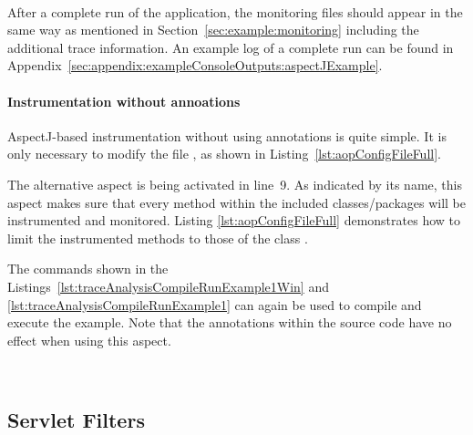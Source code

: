 \


\setBashListing



\noindent After a complete run of the application, the monitoring files should appear in %
the same way as mentioned in Section~\ref{sec:example:monitoring} including the %
additional trace information. An example log of a complete run can be found in %
Appendix~\ref{sec:appendix:exampleConsoleOutputs:aspectJExample}.

\paragraph*{Instrumentation without annoations}%

AspectJ-based instrumentation without using annotations is quite simple. It is %
only necessary to modify the file \file{\aopConfigFile{}}, as shown %
in Listing~\ref{lst:aopConfigFileFull}.

\setXMLListing


\noindent The alternative aspect  is being %
activated in line~9. As indicated by its name, this aspect makes sure that every %
method within the included classes/packages will be instrumented and monitored. %
Listing \ref{lst:aopConfigFileFull} demonstrates how to limit the %
instrumented methods to those of the class .

The commands shown in the Listings~\ref{lst:traceAnalysisCompileRunExample1Win} and %
\ref{lst:traceAnalysisCompileRunExample1} can again be used to compile and execute %
the example. Note that the annotations within the source code have no effect %
when using this aspect.

\


\subsection{Servlet Filters}\label{sec:traceAnalysis:instr:servlet}

